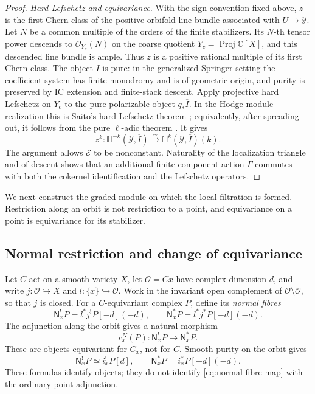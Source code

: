 \documentclass[11pt]{amsart}
\theoremstyle{definition}
\theoremstyle{remark}
\begin{document}
\begin{proof}
\smallskip
\noindent\emph{Hard Lefschetz and equivariance.}
With the sign convention fixed above, $z$ is the first Chern class of the positive
orbifold line bundle associated with $U\to\mathcal Y$.  Let $N$ be a common
multiple of the orders of the finite stabilizers.  Its $N$-th tensor power
descends to $\mathcal O_{Y_c}(N)$ on the coarse quotient
$Y_c=\operatorname{Proj}\mathbb C[X]$, and this descended line bundle is
ample.  Thus $z$ is a positive rational multiple of its first Chern class.
The object $\overline I$ is pure:
in the generalized Springer setting the coefficient system has finite
monodromy and is of geometric origin, and purity is preserved by IC
extension and finite-stack descent.  Apply projective hard Lefschetz on
$Y_c$ to the pure polarizable object $q_*\overline I$.  In the Hodge-module
realization this is Saito's hard Lefschetz theorem
\cite[Th\'eor\`eme~5.3.1]{SaitoPolarizable}; equivalently, after spreading
out, it follows from the pure $\ell$-adic theorem
\cite[Th\'eor\`eme~5.4.10]{BBD}.  It gives
\[
 z^k:\mathbb H^{-k}(\mathcal Y,\overline I)
 \xrightarrow{\sim}
 \mathbb H^k(\mathcal Y,\overline I)(k).
\]
The argument allows $\mathcal E$ to be nonconstant.  Naturality of the
localization triangle and of descent shows that an additional finite
component action $\Gamma$ commutes with
both the cokernel identification and the Lefschetz operators.
\end{proof}

We next construct the graded module on which the local filtration is
formed.  Restriction along an orbit is not restriction to a point, and
equivariance on a point is equivariance for its stabilizer.

\subsection{Normal restriction and change of equivariance}

Let $C$ act on a smooth variety $X$, let $\mathcal O=Cx$ have complex
dimension $d$, and write $j:\mathcal O\hookrightarrow X$ and
$l:\{x\}\hookrightarrow\mathcal O$.  Work in the invariant open complement
of $\overline{\mathcal O}\setminus\mathcal O$, so that $j$ is closed.
For a $C$-equivariant complex $P$, define its \emph{normal fibres}
\[
 \mathsf N_x^!P=l^*j^!P[-d](-d),\qquad
 \mathsf N_x^*P=l^*j^*P[-d](-d).
\]
The adjunction along the orbit gives a natural morphism
\begin{equation}\label{eq:normal-fibre-map}
 c_x^N(P):\mathsf N_x^!P\longrightarrow\mathsf N_x^*P.
\end{equation}
These are objects equivariant for $C_x$, not for $C$.  Smooth purity
on the orbit gives
\begin{equation}\label{eq:normal-point-objects}
 \mathsf N_x^!P\simeq i_x^!P[d],\qquad
 \mathsf N_x^*P=i_x^*P[-d](-d).
\end{equation}
These formulas identify objects; they do not identify
\eqref{eq:normal-fibre-map} with the ordinary point adjunction.
\end{document}
